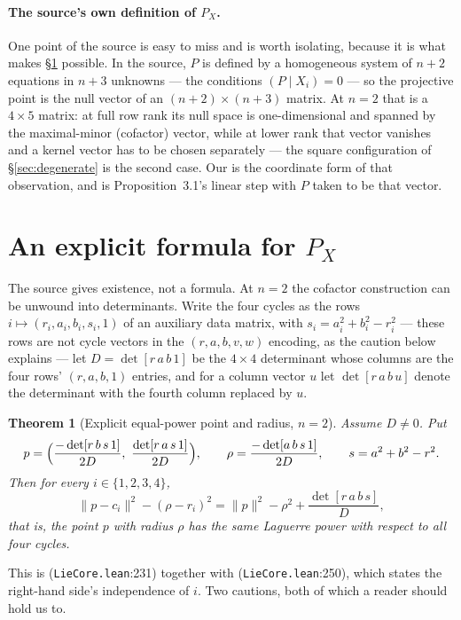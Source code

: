 \documentclass[11pt]{article}
\newtheorem{theorem}{Theorem}
\theoremstyle{definition}
\theoremstyle{remark}
\newcommand{\src}[3]{\texttt{#2}:#3}
\begin{document}
\paragraph{The source's own definition of $P_X$.} One point of the source is easy to miss and is
worth isolating, because it is what makes \S\ref{sec:explicit} possible. In the source, $P$ is
defined by a homogeneous system of $n+2$ equations in $n+3$ unknowns --- the conditions
$(P\mid X_i)=0$ --- so the projective point is the null vector of an $(n+2)\times(n+3)$ matrix. At
$n=2$ that is a $4\times5$ matrix: at full row rank its null space is one-dimensional and spanned by
the maximal-minor (cofactor) vector, while at lower rank that vector vanishes and a kernel vector has
to be chosen separately --- the square configuration of \S\ref{sec:degenerate} is the second case. Our
 is the coordinate form of that observation, and
 is Proposition~3.1's linear step with $P$ taken to be that vector.

\section{An explicit formula for \texorpdfstring{$P_X$}{P\_X}}\label{sec:explicit}

The source gives existence, not a formula. At $n=2$ the cofactor construction can be unwound into
determinants. Write the four cycles as the rows $i\mapsto(r_i,a_i,b_i,s_i,1)$ of an auxiliary data
matrix, with $s_i=a_i^2+b_i^2-r_i^2$ --- these rows are not cycle vectors in the
$(r,a,b,v,w)$ encoding, as the caution below explains --- let $D=\det[r\,a\,b\,1]$ be the $4\times4$ determinant whose columns are
the four rows' $(r,a,b,1)$ entries, and for a column vector $u$ let $\det[r\,a\,b\,u]$ denote the
determinant with the fourth column replaced by $u$.

\begin{theorem}[Explicit equal-power point and radius, $n=2$]\label{thm:explicit}
Assume $D\neq0$. Put
\[
p=\Bigl(\frac{-\det[r\,b\,s\,1]}{2D},\ \frac{\det[r\,a\,s\,1]}{2D}\Bigr),
\qquad
\rho=\frac{-\det[a\,b\,s\,1]}{2D},
\qquad s=a^2+b^2-r^2 .
\]
Then for every $i\in\{1,2,3,4\}$,
\[
\lVert p-c_i\rVert^2-(\rho-r_i)^2=\lVert p\rVert^2-\rho^2+\frac{\det[r\,a\,b\,s]}{D},
\]
that is, the point $p$ with radius $\rho$ has the \emph{same} Laguerre power with respect to all four
cycles.
\end{theorem}

This is  (\src{PaperK}{LieCore.lean}{231}) together with
 (\src{PaperK}{LieCore.lean}{250}), which states the
right-hand side's independence of $i$. Two cautions, both of which a reader should hold us to.
\end{document}
